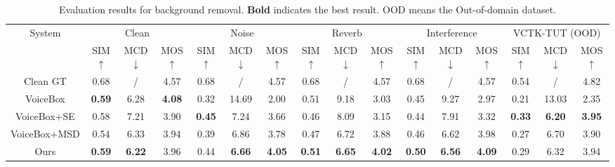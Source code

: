 \begin{table*}[htbp]
    \centering
    \caption{Evaluation results for background removal. \textbf{Bold} indicates the best result. OOD means the Out-of-domain dataset. }
    \label{tab:removal}
    \setlength\tabcolsep{4.7pt}
    \begin{tabular}{c|ccc|ccc|ccc|ccc|ccc}
    \toprule
        \multirow{2}{*}{System} &  \multicolumn{3}{c|}{Clean} & \multicolumn{3}{c|}{Noise} & \multicolumn{3}{c|}{Reverb} & \multicolumn{3}{c}{Interference} & \multicolumn{3}{c}{VCTK-TUT (OOD)}  \\ 
     ~ & SIM$\uparrow$ & MCD$\downarrow$ & MOS$\uparrow$  &   SIM$\uparrow$  & MCD$\downarrow$ & MOS$\uparrow$ &   SIM$\uparrow$  & MCD$\downarrow$ & MOS$\uparrow$ &   SIM$\uparrow$  & MCD$\downarrow$ & MOS$\uparrow$ &   SIM$\uparrow$  & MCD$\downarrow$ & MOS$\uparrow$ \\ \midrule
Clean GT & 0.68 & / & 4.57 & 0.68 & / & 4.57 & 0.68 & / & 4.57 & 0.68 & / & 4.57 & 0.54 & / & 4.82 \\ \midrule      
        VoiceBox & \textbf{0.59} & 6.28 & \textbf{4.08} & 0.32 & 14.69 & 2.00 & 0.51 & 9.18 & 3.03 & 0.45 & 9.27 & 2.97  & 0.21 & 13.03 & 2.35 \\ 
        VoiceBox+SE & 0.58 & 7.21 & 3.90 & \textbf{0.45} & 7.24 & 3.66 & 0.46 & 8.09 & 3.15 & 0.44 & 7.91 & 3.32 & \textbf{0.33} & \textbf{6.20} & \textbf{3.95}\\ 
        VoiceBox+MSD & 0.54 & 6.33 & 3.94 & 0.39 & 6.86 & 3.78 & 0.47 & 6.72 & 3.88 & 0.46 & 6.62 & 3.98 & 0.27 & 6.70 & 3.90 \\ \midrule
        Ours & \textbf{0.59} & \textbf{6.22} & 3.96 & 0.44 & \textbf{6.66} & \textbf{4.05}& \textbf{0.51} & \textbf{6.65} & \textbf{4.02} & \textbf{0.50} & \textbf{6.56} & \textbf{4.09} & 0.29  & 6.32  & 3.94\\  
        \bottomrule
    \end{tabular}
    \vspace{-0.2cm}
\end{table*}



